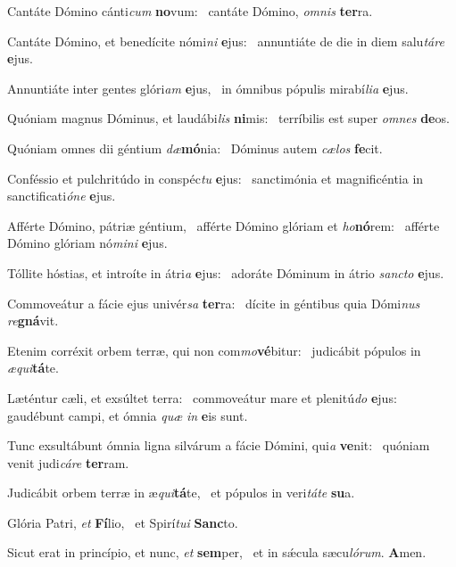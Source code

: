 \item Cantáte Dómino cánti\textit{cum} \textbf{no}vum:~\psstar{} cantáte Dómino, \textit{omnis} \textbf{ter}ra.
\item Cantáte Dómino, et benedícite nómi\textit{ni} \textbf{e}jus:~\psstar{} annuntiáte de die in diem salu\textit{táre} \textbf{e}jus.
\item Annuntiáte inter gentes glóri\textit{am} \textbf{e}jus,~\psstar{} in ómnibus pópulis mirabí\textit{lia} \textbf{e}jus.
\item Quóniam magnus Dóminus, et laudábi\textit{lis} \textbf{ni}mis:~\psstar{} terríbilis est super \textit{omnes} \textbf{de}os.
\item Quóniam omnes dii géntium \textit{dæ}\textbf{mó}nia:~\psstar{} Dóminus autem \textit{cælos} \textbf{fe}cit.
\item Conféssio et pulchritúdo in conspéc\textit{tu} \textbf{e}jus:~\psstar{} sanctimónia et magnificéntia in sanctificati\textit{óne} \textbf{e}jus.
\item Afférte Dómino, pátriæ géntium,~\pscross{} afférte Dómino glóriam et \textit{ho}\textbf{nó}rem:~\psstar{} afférte Dómino glóriam nó\textit{mini} \textbf{e}jus.
\item Tóllite hóstias, et introíte in átri\textit{a} \textbf{e}jus:~\psstar{} adoráte Dóminum in átrio \textit{sancto} \textbf{e}jus.
\item Commoveátur a fácie ejus univér\textit{sa} \textbf{ter}ra:~\psstar{} dícite in géntibus quia Dómi\textit{nus} \textit{re}\textbf{gná}vit.
\item Etenim corréxit orbem terræ, qui non com\textit{mo}\textbf{vé}bitur:~\psstar{} judicábit pópulos in \textit{æqui}\textbf{tá}te.
\item Læténtur cæli, et exsúltet terra:~\pscross{} commoveátur mare et plenitú\textit{do} \textbf{e}jus:~\psstar{} gaudébunt campi, et ómnia \textit{quæ} \textit{in} \textbf{e}is sunt.
\item Tunc exsultábunt ómnia ligna silvárum a fácie Dómini, qui\textit{a} \textbf{ve}nit:~\psstar{} quóniam venit judi\textit{cáre} \textbf{ter}ram.
\item Judicábit orbem terræ in æ\textit{qui}\textbf{tá}te,~\psstar{} et pópulos in veri\textit{táte} \textbf{su}a.
\item Glória Patri, \textit{et} \textbf{Fí}lio,~\psstar{} et Spirí\textit{tui} \textbf{Sanc}to.
\item Sicut erat in princípio, et nunc, \textit{et} \textbf{sem}per,~\psstar{} et in sǽcula sæcu\textit{lórum}. \textbf{A}men.